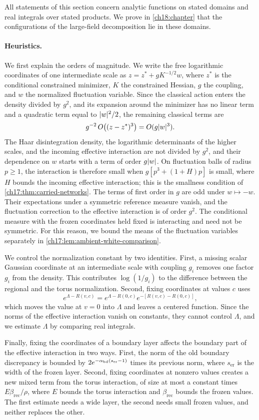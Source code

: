 All statements of this section concern analytic functions on stated domains and real integrals over stated products. We prove in \cref{ch18:chapter} that the configurations of the large-field decomposition lie in these domains.

\paragraph{Heuristics.}
We first explain the orders of magnitude. We write the free logarithmic coordinates of one intermediate scale as $z=z^*+gK^{-1/2}w$, where $z^*$ is the conditional constrained minimizer, $K$ the constrained Hessian, $g$ the coupling, and $w$ the normalized fluctuation variable. Since the classical action enters the density divided by $g^2$, and its expansion around the minimizer has no linear term and a quadratic term equal to $\lvert w\rvert^2/2$, the remaining classical terms are
\[
 g^{-2}\,O\bigl((z-z^*)^3\bigr)=O(g\lvert w\rvert^3).
\]
The Haar disintegration density, the logarithmic determinants of the higher scales, and the incoming effective interaction are not divided by $g^2$, and their dependence on $w$ starts with a term of order $g\lvert w\rvert$. On fluctuation balls of radius $p\ge1$, the interaction is therefore small when $g[p^3+(1+H)p]$ is small, where $H$ bounds the incoming effective interaction; this is the smallness condition of \cref{ch17:thm:carried-networks}. The terms of first order in $g$ are odd under $w\mapsto-w$. Their expectations under a symmetric reference measure vanish, and the fluctuation correction to the effective interaction is of order $g^2$. The conditional measure with the frozen coordinates held fixed is interacting and need not be symmetric. For this reason, we bound the means of the fluctuation variables separately in \cref{ch17:lem:ambient-white-comparison}.

We control the normalization constant by two identities. First, a missing scalar Gaussian coordinate at an intermediate scale with coupling $g_i$ removes one factor $g_i$ from the density. This contributes $\log(1/g_i)$ to the difference between the regional and the torus normalization. Second, fixing coordinates at values $c$ uses
\[
 e^{\Lambda-R(v,c)}=e^{\Lambda-R(0,c)}e^{-[R(v,c)-R(0,c)]},
\]
which moves the value at $v=0$ into $\Lambda$ and leaves a centered function. Since the norms of the effective interaction vanish on constants, they cannot control $\Lambda$, and we estimate $\Lambda$ by comparing real integrals.

Finally, fixing the coordinates of a boundary layer affects the boundary part of the effective interaction in two ways. First, the norm of the old boundary discrepancy is bounded by $2e^{-\alpha_{\mathrm{bd}}(s_{\mathrm{er}}-1)}$ times its previous norm, where $s_{\mathrm{er}}$ is the width of the frozen layer. Second, fixing coordinates at nonzero values creates a new mixed term from the torus interaction, of size at most a constant times $E\beta_{\mathrm{rec}}/\rho$, where $E$ bounds the torus interaction and $\beta_{\mathrm{rec}}$ bounds the frozen values. The first estimate needs a wide layer, the second needs small frozen values, and neither replaces the other.

